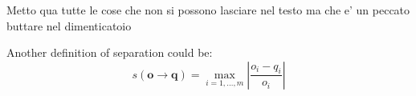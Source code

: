 Metto qua tutte le cose che non si possono lasciare nel testo ma che e' un peccato buttare nel dimenticatoio

\begin{definition} Another definition of separation could be:
\[
s\left(\mathbf{o}\rightarrow\mathbf{q}\right)=\max_{i=1,\dots,m}\left|\frac{o_{i}-q_{i}}{o_{i}}\right|
\]

\end{definition}

